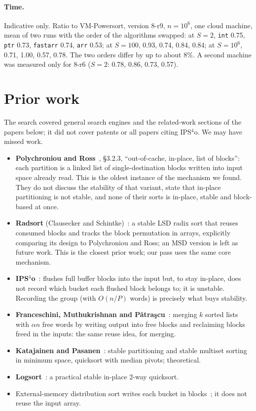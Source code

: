 \documentclass[11pt]{article}
\theoremstyle{remark}
\begin{document}
\paragraph{Time.}
Indicative only. Ratio to VM-Powersort, version 8-r9, $n=10^6$, one cloud machine, mean of two
runs with the order of the algorithms swapped: at $S=2$, \texttt{int} 0.75, \texttt{ptr} 0.73,
\texttt{fastarr} 0.74, \texttt{arr} 0.53; at $S=100$, 0.93, 0.74, 0.84, 0.84; at $S=10^6$,
0.71, 1.00, 0.57, 0.78. The two orders differ by up to about $8\%$. A second machine was
measured only for 8-r6 ($S=2$: 0.78, 0.86, 0.73, 0.57).

\section{Prior work}

The search covered general search engines and the related-work sections of the papers
below; it did not cover patents or all papers citing IPS$^4$o. We may have missed work.

\begin{itemize}
\item \textbf{Polychroniou and Ross}~\cite{pr14}, \S3.2.3, ``out-of-cache, in-place,
list of blocks'': each partition is a linked list of single-destination blocks
written into input space already read. This is the oldest instance of the mechanism we
found. They do not discuss the stability of that variant, state that in-place
partitioning is not stable, and none of their sorts is in-place, stable and
block-based at once.
\item \textbf{Radsort} (Clausecker and Schintke)~\cite{radsort}: a stable LSD radix sort that
reuses consumed blocks and tracks the block permutation in arrays, explicitly
comparing its design to Polychroniou and Ross; an MSD version is left as future
work. This is the closest prior work; our pass uses the same core mechanism.
\item \textbf{IPS$^4$o}~\cite{ips4o}: flushes full buffer blocks into the input but,
to stay in-place, does not record which bucket each flushed block belongs to;
it is unstable. Recording the group (with $O(n/P)$ words) is precisely what buys stability.
\item \textbf{Franceschini, Muthukrishnan and P\u{a}tra\c{s}cu}~\cite{fmp07}: merging $k$ sorted
lists with $\alpha n$ free words by writing output into free blocks and reclaiming blocks freed
in the inputs: the same reuse idea, for merging.
\item \textbf{Katajainen and Pasanen}~\cite{kp92,kp94}: stable partitioning and stable
multiset sorting in minimum space, quicksort with median pivots; theoretical.
\item \textbf{Logsort}~\cite{logsort}: a practical stable in-place 2-way quicksort.
\item External-memory distribution sort writes each bucket in blocks~\cite{vitter};
it does not reuse the input array.
\end{itemize}
\end{document}
